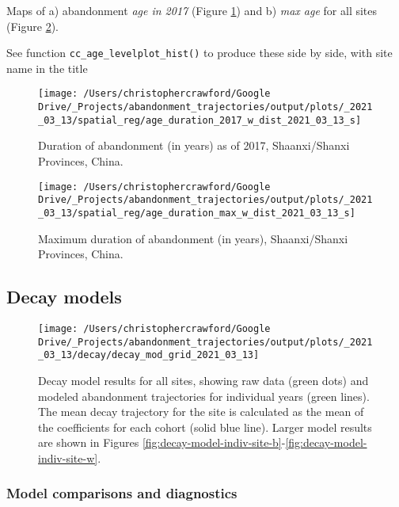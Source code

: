 \documentclass[
]{article}
\begin{document}
Maps of a) abandonment \emph{age in 2017} (Figure \ref{fig:plot-age-in-2017}) and b) \emph{max age} for all sites (Figure \ref{fig:plot-max-age}).

See function \texttt{cc\_age\_levelplot\_hist()} to produce these side by side, with site name in the title



\begin{figure}
\texttt{[image: /Users/christophercrawford/Google Drive/\_Projects/abandonment\_trajectories/output/plots/\_2021\_03\_13/spatial\_reg/age\_duration\_2017\_w\_dist\_2021\_03\_13\_s]} \caption{Duration of abandonment (in years) as of 2017, Shaanxi/Shanxi Provinces, China.}\label{fig:plot-age-in-2017}
\end{figure}



\begin{figure}
\texttt{[image: /Users/christophercrawford/Google Drive/\_Projects/abandonment\_trajectories/output/plots/\_2021\_03\_13/spatial\_reg/age\_duration\_max\_w\_dist\_2021\_03\_13\_s]} \caption{Maximum duration of abandonment (in years), Shaanxi/Shanxi Provinces, China.}\label{fig:plot-max-age}
\end{figure}

\hypertarget{decay-models}{%
\subsection{Decay models}\label{decay-models}}



\begin{figure}
\texttt{[image: /Users/christophercrawford/Google Drive/\_Projects/abandonment\_trajectories/output/plots/\_2021\_03\_13/decay/decay\_mod\_grid\_2021\_03\_13]} \caption{Decay model results for all sites, showing raw data (green dots) and modeled abandonment trajectories for individual years (green lines). The mean decay trajectory for the site is calculated as the mean of the coefficients for each cohort (solid blue line). Larger model results are shown in Figures \ref{fig:decay-model-indiv-site-b}-\ref{fig:decay-model-indiv-site-w}.}\label{fig:decay-model-grid}
\end{figure}

\hypertarget{mod-AIC-diag}{%
\subsubsection{Model comparisons and diagnostics}\label{mod-AIC-diag}}
\end{document}
